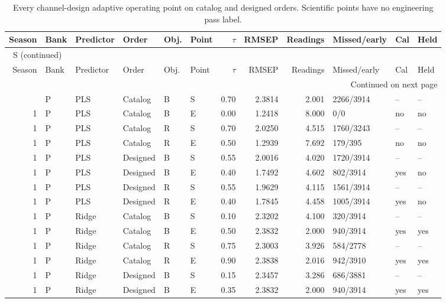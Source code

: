 \documentclass[10pt,a4paper]{article}
\renewcommand{\thetable}{S\arabic{table}}
\begin{document}
\begingroup\footnotesize
\setlength{\tabcolsep}{3.5pt}
\renewcommand{\arraystretch}{1.10}
\begin{longtable}{rlllllrrrlll}
\caption{Every channel-design adaptive operating point on catalog and designed orders. Scientific points have no engineering pass label.}\label{tab:v3adaptive}\\
\toprule
Season & Bank & Predictor & Order & Obj. & Point & $\tau$ & RMSEP & Readings & Missed/early & Cal & Held \\
\midrule
\endfirsthead
\multicolumn{12}{l}{\tablename~\thetable{} (continued)}\\
\toprule
Season & Bank & Predictor & Order & Obj. & Point & $\tau$ & RMSEP & Readings & Missed/early & Cal & Held \\
\midrule
\endhead
\midrule
\multicolumn{12}{r}{Continued on next page}\\
\endfoot
\bottomrule
\endlastfoot
1 & P & PLS & Catalog & B & S & 0.70 & 2.3814 & 2.001 & 2266/3914 & -- & -- \\
1 & P & PLS & Catalog & B & E & 0.00 & 1.2418 & 8.000 & 0/0 & no & no \\
1 & P & PLS & Catalog & R & S & 0.70 & 2.0250 & 4.515 & 1760/3243 & -- & -- \\
1 & P & PLS & Catalog & R & E & 0.50 & 1.2939 & 7.692 & 179/395 & no & no \\
1 & P & PLS & Designed & B & S & 0.55 & 2.0016 & 4.020 & 1720/3914 & -- & -- \\
1 & P & PLS & Designed & B & E & 0.40 & 1.7492 & 4.602 & 802/3914 & yes & no \\
1 & P & PLS & Designed & R & S & 0.55 & 1.9629 & 4.115 & 1561/3914 & -- & -- \\
1 & P & PLS & Designed & R & E & 0.40 & 1.7845 & 4.458 & 1005/3914 & yes & no \\
1 & P & Ridge & Catalog & B & S & 0.10 & 2.3202 & 4.100 & 320/3914 & -- & -- \\
1 & P & Ridge & Catalog & B & E & 0.50 & 2.3832 & 2.000 & 940/3914 & yes & yes \\
1 & P & Ridge & Catalog & R & S & 0.75 & 2.3003 & 3.926 & 584/2778 & -- & -- \\
1 & P & Ridge & Catalog & R & E & 0.90 & 2.3838 & 2.016 & 942/3910 & yes & yes \\
1 & P & Ridge & Designed & B & S & 0.15 & 2.3457 & 3.286 & 686/3881 & -- & -- \\
1 & P & Ridge & Designed & B & E & 0.35 & 2.3832 & 2.000 & 940/3914 & yes & yes \\

\end{longtable}
\end{document}
